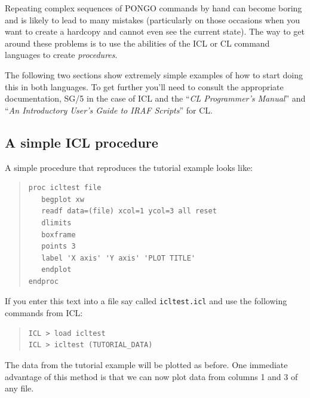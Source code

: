 \documentclass[twoside,11pt]{article}
\newcommand{\xref}[3]{#1}
\renewcommand{\_}{\texttt{\symbol{95}}}
\begin{document}
Repeating complex sequences of PONGO commands by hand can become
boring and is likely to lead to many mistakes (particularly on those
occasions when you want to create a hardcopy and cannot even see the
current state). The way to get around these problems is to use the
abilities of the ICL or CL command languages to create {\em
procedures}.

The following two sections show extremely simple examples of how to
start doing this in both languages. To get further you'll need to
consult the appropriate documentation, \xref{SG/5}{sg5}{} in the case
of ICL and the ``{\em CL Programmer's Manual}'' and
``{\em An Introductory User's Guide to IRAF Scripts}'' for CL.

\subsection{A simple ICL procedure}

A simple procedure that reproduces the tutorial example looks like:
\begin{quote}
\begin{verbatim}
proc icltest file
   begplot xw
   readf data=(file) xcol=1 ycol=3 all reset
   dlimits
   boxframe
   points 3
   label 'X axis' 'Y axis' 'PLOT TITLE'
   endplot
endproc
\end{verbatim}
\end{quote}
If you enter this text into a file say called \verb+icltest.icl+ and use
the following commands from ICL:
\begin{quote}
\begin{verbatim}
ICL > load icltest
ICL > icltest (TUTORIAL_DATA)
\end{verbatim}
\end{quote}
The data from the tutorial example will be plotted as before. One
immediate advantage of this method is that we can now plot data from
columns 1 and 3 of any file.
\end{document}
